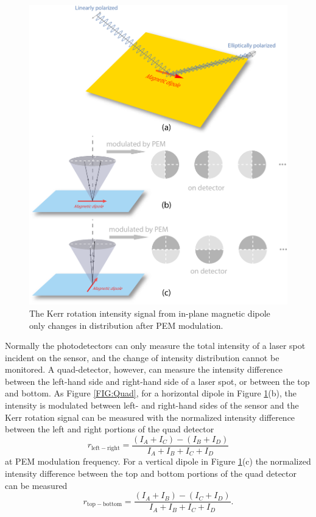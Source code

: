 \documentclass[pdflatex, sectionletters, 12pt]{pittetd}    %
\begin{document}
\begin{figure}[p]
	\centering
	\includegraphics[width=.9\textwidth]{Drawing/KerrInPlane.pdf}
	\caption{The Kerr rotation intensity signal from in-plane magnetic dipole only changes in distribution after PEM modulation.}
	\label{FIG:KerrInPlane}
\end{figure}

Normally the photodetectors can only measure the total intensity of a laser spot incident on the sensor, and the change of intensity distribution cannot be monitored. A quad-detector, however, can measure the intensity difference between the left-hand side and right-hand side of a laser spot, or between the top and bottom. As Figure \ref{FIG:Quad}, for a horizontal dipole in Figure \ref{FIG:KerrInPlane}(b), the intensity is modulated between left- and right-hand sides of the sensor and the Kerr rotation signal can be measured with the normalized intensity difference between the left and right portions of the quad detector
$$
r_\mathrm{left-right} = \frac{(I_A + I_C) - (I_B + I_D)}{I_A + I_B + I_C + I_D}
$$
at PEM modulation frequency. For a vertical dipole in Figure \ref{FIG:KerrInPlane}(c) the normalized intensity difference between the top and bottom portions of the quad detector can be measured
$$
r_\mathrm{top-bottom} = \frac{(I_A + I_B) - (I_C + I_D)}{I_A + I_B + I_C + I_D}.
$$
\\
\end{document}
